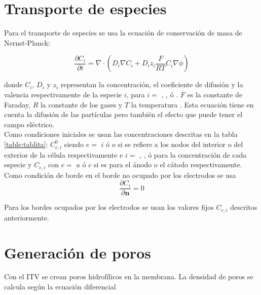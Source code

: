 \documentclass[11pt,a4paper,twoside]{tesis}
\newcommand{\h}{\ce{H^+}}
\newcommand{\oh}{\ce{OH^-}}
\newcommand{\na}{\ce{Na^+}}
\newcommand{\cl}{\ce{Cl^-}}
\begin{document}
\section{Transporte de especies}
Para el transporte de especies se usa la ecuación de conservación de masa de Nernst-Planck:

\begin{equation} \label{eq:trans}
	\frac{\partial C_i}{\partial t} = \nabla \cdot \left( D_i \nabla C_i + D_i z_i \frac{F}{R T} C_i \nabla \phi \right)
\end{equation}

donde $C_i$, $D_i$ y $z_i$ representan la concentración, el coeficiente de difusión y la valencia 
respectivamente de la especie $i$, para $i = $ \h, \oh, \na ó \cl.
$F$ es la constante de Faraday, $R$ la constante de los gases y $T$ la temperatura \cite{fodava}. 
Esta ecuación tiene en cuenta la difusión de las partículas pero también el efecto que puede tener el campo eléctrico.\\

Como condiciones iniciales se usan las concentraciones descritas en la tabla \ref{table:tablita}: $C_{e, i}^0$ siendo $e =$ $i$ ó $o$ si se refiere a los nodos del interior o del exterior de la célula respectivamente e $i =$ \h, \oh, \na ó \cl para la concentración de cada especie y $C_{e,i}$ con $e =$ $a$ ó $c$ si es para el ánodo o el cátodo respectivamente.\\

Como condición de borde en el borde no ocupado por los electrodos se usa
\begin{equation}
	\frac{\partial C_i}{\partial \mathbf{n}} = 0
\end{equation}

Para los bordes ocupados por los electrodos se usan los valores fijos $C_{e,i}$ descritos anteriormente.



\section{Generación de poros}
Con el ITV se crean poros hidrofílicos en la membrana. La densidad de poros se calcula según la ecuación diferencial  
\end{document}
